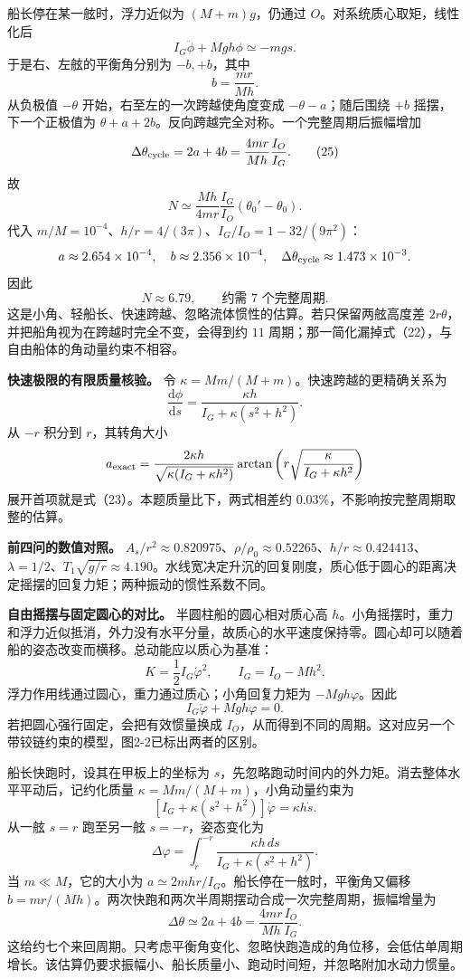 \documentclass[12pt,a4paper,UTF8]{ctexart}
\begin{document}
船长停在某一舷时，浮力近似为 \((M+m)g\)，仍通过
\(O\)。对系统质心取矩，线性化后 \[
I_G\ddot\phi+Mgh\phi\simeq-mgs.
\] 于是右、左舷的平衡角分别为 \(-b,+b\)，其中 \[
b=\frac{mr}{Mh}. \tag{24}
\] 从负极值 \(-\theta\) 开始，右至左的一次跨越使角度变成
\(-\theta-a\)；随后围绕 \(+b\) 摇摆，下一个正极值为
\(\theta+a+2b\)。反向跨越完全对称。一个完整周期后振幅增加 \[
\Delta\theta_{\rm cycle}=2a+4b
=\frac{4mr}{Mh}\frac{I_O}{I_G}. \tag{25}
\] 故 \[
\boxed{N\simeq\frac{Mh}{4mr}\frac{I_G}{I_O}
(\theta_0'-\theta_0)}. \tag{26}
\] 代入 \(m/M=10^{-4}\)、\(h/r=4/(3\pi)\)、\(I_G/I_O=1-32/(9\pi^2)\)：
\[
a\approx2.654\times10^{-4},\quad
b\approx2.356\times10^{-4},\quad
\Delta\theta_{\rm cycle}\approx1.473\times10^{-3}.
\] 因此 \[
N\approx6.79,
\qquad \boxed{\text{约需 }7\text{ 个完整周期}}. \tag{27}
\] 这是小角、轻船长、快速跨越、忽略流体惯性的估算。若只保留两舷高度差
\(2r\theta\)，并把船角视为在跨越时完全不变，会得到约 \(11\)
周期；那一简化漏掉式（22），与自由船体的角动量约束不相容。

\textbf{快速极限的有限质量核验。} 令
\(\kappa=Mm/(M+m)\)。快速跨越的更精确关系为 \[
\frac{\mathrm d\phi}{\mathrm ds}
=\frac{\kappa h}{I_G+\kappa(s^2+h^2)}.
\] 从 \(-r\) 积分到 \(r\)，其转角大小 \[
a_{\rm exact}=\frac{2\kappa h}{\sqrt{\kappa(I_G+\kappa h^2)}}
\arctan\left(r\sqrt{\frac{\kappa}{I_G+\kappa h^2}}\right)
\] 展开首项就是式（23）。本题质量比下，两式相差约
\(0.03\%\)，不影响按完整周期取整的估算。

\textbf{前四问的数值对照。}
\(A_s/r^2\approx0.820975\)、\(\rho/\rho_0\approx0.52265\)、\(h/r\approx0.424413\)、\(\lambda=1/2\)、\(T_1\sqrt{g/r}\approx4.190\)。水线宽决定升沉的回复刚度，质心低于圆心的距离决定摇摆的回复力矩；两种振动的惯性系数不同。

\textbf{自由摇摆与固定圆心的对比。} 半圆柱船的圆心相对质心高
\(h\)。小角摇摆时，重力和浮力近似抵消，外力没有水平分量，故质心的水平速度保持零。圆心却可以随着船的姿态改变而横移。总动能应以质心为基准：
\[
K=\frac12I_G\dot\varphi^2,\qquad I_G=I_O-Mh^2.
\] 浮力作用线通过圆心，重力通过质心；小角回复力矩为
\(-Mgh\varphi\)。因此 \[
I_G\ddot\varphi+Mgh\varphi=0.
\] 若把圆心强行固定，会把有效惯量换成
\(I_O\)，从而得到不同的周期。这对应另一个带铰链约束的模型，图2-2已标出两者的区别。

船长快跑时，设其在甲板上的坐标为
\(s\)，先忽略跑动时间内的外力矩。消去整体水平平动后，记约化质量
\(\kappa=Mm/(M+m)\)，小角动量约束为 \[
[I_G+\kappa(s^2+h^2)]\dot\varphi=\kappa h\dot s.
\] 从一舷 \(s=r\) 跑至另一舷 \(s=-r\)，姿态变化为 \[
\Delta\varphi=\int_r^{-r}\frac{\kappa h\,ds}{I_G+\kappa(s^2+h^2)}.
\] 当 \(m\ll M\)，它的大小为
\(a\simeq2mhr/I_G\)。船长停在一舷时，平衡角又偏移
\(b=mr/(Mh)\)。两次快跑和两次半周期摆动合成一次完整周期，振幅增量为 \[
\Delta\theta\simeq2a+4b=\frac{4mr}{Mh}\frac{I_O}{I_G}.
\]
这给约七个来回周期。只考虑平衡角变化、忽略快跑造成的角位移，会低估单周期增长。该估算仍要求振幅小、船长质量小、跑动时间短，并忽略附加水动力惯量。
\end{document}
